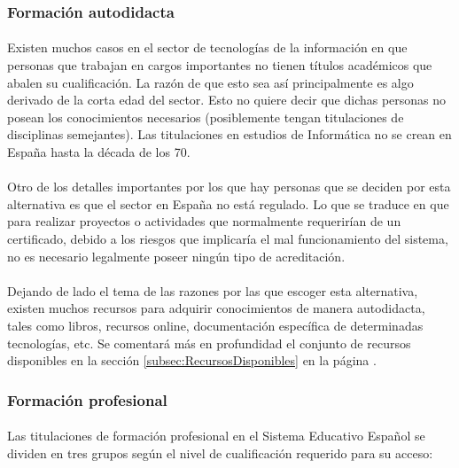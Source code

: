 \documentclass[11pt, a4paper]{report}
\begin{document}
            
			\subsubsection{Formación autodidacta}
        		
                \paragraph{}
                Existen muchos casos en el sector de tecnologías de la información en que personas que trabajan en cargos importantes no tienen títulos académicos que abalen su cualificación. La razón de que esto sea así principalmente es algo derivado de la corta edad del sector. Esto no quiere decir que dichas personas no posean los conocimientos necesarios (posiblemente tengan titulaciones de disciplinas semejantes). Las titulaciones en estudios de Informática no se crean en España hasta la década de los 70.
        	    
                \paragraph{}
                Otro de los detalles importantes por los que hay personas que se deciden por esta alternativa es que el sector en España no está regulado. Lo que se traduce en que para realizar proyectos o actividades que normalmente requerirían de un certificado, debido a los riesgos que implicaría el mal funcionamiento del sistema, no es necesario legalmente poseer ningún tipo de acreditación.
                
                \paragraph{}
				Dejando de lado el tema de las razones por las que escoger esta alternativa, existen muchos recursos para adquirir conocimientos de manera autodidacta, tales como libros, recursos online, documentación específica de determinadas tecnologías, etc. Se comentará más en profundidad el conjunto de recursos disponibles en la sección \ref{subsec:RecursosDisponibles} en la página \pageref{subsec:RecursosDisponibles}.

    		\subsubsection{Formación profesional}
        		
                \paragraph{}
                Las titulaciones de formación profesional en el Sistema Educativo Español se dividen en tres grupos según el nivel de cualificación requerido para su acceso:
                
\end{document}
